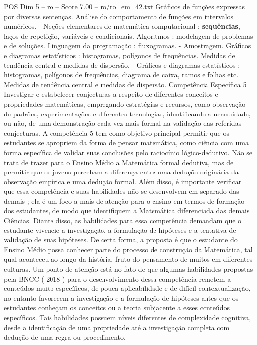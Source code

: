 \begin{textsample}{POS Dim 5 – ro – Score 7.00 – ro/ro\_em\_42.txt}
Gráficos de funções expressas por diversas sentenças.
Análise do comportamento de funções em intervalos numéricos. - Noções elementares de matemática computacional : \textbf{sequências}, laços de repetição, variáveis e condicionais.
Algoritmos : modelagem de problemas e de soluções.
Linguagem da programação : fluxogramas. - Amostragem.
Gráficos e diagramas estatísticos : histogramas, polígonos de frequências.
Medidas de tendência central e medidas de dispersão. - Gráficos e diagramas estatísticos : histogramas, polígonos de frequências, diagrama de caixa, ramos e folhas etc.
Medidas de tendência central e medidas de dispersão.
Competência Específica 5 Investigar e estabelecer conjecturas a respeito de diferentes conceitos e propriedades matemáticas, empregando estratégias e recursos, como observação de padrões, experimentações e diferentes tecnologias, identificando a necessidade, ou não, de uma demonstração cada vez mais formal na validação das referidas conjecturas.
A competência 5 tem como objetivo principal permitir que os estudantes se apropriem da forma de pensar matemática, como ciência com uma forma específica de validar suas conclusões pelo raciocínio lógico-dedutivo.
Não se trata de trazer para o Ensino Médio a Matemática formal dedutiva, mas de permitir que os jovens percebam a diferença entre uma dedução originária da observação empírica e uma dedução formal.
Além disso, é importante verificar que essa competência e suas habilidades não se desenvolvem em separado das demais ; ela é um foco a mais de atenção para o ensino em termos de formação dos estudantes, de modo que identifiquem a Matemática diferenciada das demais Ciências.
Diante disso, as habilidades para essa competência demandam que o estudante vivencie a investigação, a formulação de hipóteses e a tentativa de validação de suas hipóteses.
De certa forma, a proposta é que o estudante do Ensino Médio possa conhecer parte do processo de construção da Matemática, tal qual aconteceu ao longo da história, fruto do pensamento de muitos em diferentes culturas.
Um ponto de atenção está no fato de que algumas habilidades propostas pela BNCC ( 2018 ) para o desenvolvimento dessa competência remetem a conteúdos muito específicos, de pouca aplicabilidade e de difícil contextualização, no entanto favorecem a investigação e a formulação de hipóteses antes que os estudantes conheçam os conceitos ou a teoria subjacente a esses conteúdos específicos.
Tais habilidades possuem níveis diferentes de complexidade cognitiva, desde a identificação de uma propriedade até a investigação completa com dedução de uma regra ou procedimento.

\end{textsample}
